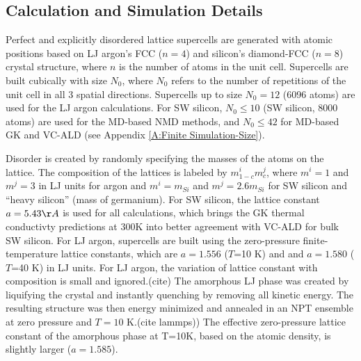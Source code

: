 \documentclass[aps,prb,onecolumn,preprint,superscriptaddress,amsmath,amssymb,floatfix]{revtex4}
\begin{document}


\subsection{\label{S:Calculation}Calculation and Simulation Details}

Perfect and explicitly disordered lattice supercells are generated 
with atomic positions 
based on LJ argon's FCC ($n=4$) and silicon's diamond-FCC ($n=8$) 
crystal structure, where $n$ is the number of atoms 
in the unit cell.   
Supercells are built cubically with size $N_0$, where $N_0$ refers to the 
number of repetitions of the unit cell in all 3 
spatial directions. Supercells up to size $N_0 = 12$ 
(6096 atoms) are used for the LJ argon calculations. For SW silicon, 
$N_0 \le 10$ (SW silicon, 8000 atoms) are used for 
the MD-based NMD methods, and $N_0 \le 42$ for MD-based GK and VC-ALD 
(see Appendix \ref{A:Finite Simulation-Size}).  

Disorder is created by randomly specifying the masses of the atoms 
on the lattice. 
The composition of the lattices is labeled by $m^i_{1-c}m^j_{c}$,  
where $m^i=1$ and $m^j=3$ in 
LJ units for argon and $m^i=m_{Si}$ and $m^j=2.6m_{Si}$ 
for SW silicon and ``heavy silicon'' (mass of germanium). 
For SW silicon, the lattice constant $a=5.43 \AA$ is used 
for all calculations, which brings the GK thermal conductivty 
predictions at 300K\cite{goicochea_thermal_2010,he_lattice_2012} 
into better agreement with VC-ALD
\cite{sellan_cross-plane_2010} for bulk SW silicon.
For LJ argon, supercells are built using 
the zero-pressure finite-temperature lattice constants, 
which are $a=1.556$ ($T$=10 K) and 
and $a=1.580$ ($T$=40 K) in LJ units.\cite{mcgaughey_phonon_2004} 
For LJ argon, the variation of lattice constant 
with composition is small and ignored.(cite) 
The amorphous LJ phase was created by liquifying the crystal 
and instantly quenching by removing all kinetic energy.  The resulting 
structure was then energy minimized and annealed in an NPT ensemble at 
zero pressure and $T=10$ K.(cite lammps)) 
The effective zero-pressure lattice constant  
of the amorphous phase at T=10K, based on the atomic 
density, is slightly larger 
($a = 1.585$).\cite{mcgaughey_phonon_2004}  
\end{document}
